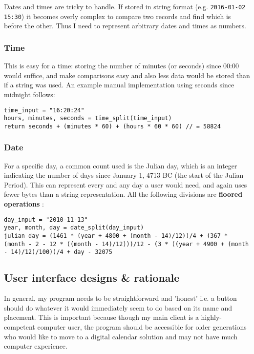 Dates and times are tricky to handle. If stored in string format (e.g.
\texttt{2016-01-02 15:30}) it becomes overly complex to compare two records and
find which is before the other. Thus I need to represent arbitrary dates and
times as numbers.


\subsubsection{Time}

This is easy for a time: storing the number of minutes (or seconds) since 00:00
would suffice, and make comparisons easy and also less data would be stored than
if a string was used. An example manual implementation using seconds
since midnight follows:

\begin{verbatim}
time_input = "16:20:24"
hours, minutes, seconds = time_split(time_input)
return seconds + (minutes * 60) + (hours * 60 * 60) // = 58824
\end{verbatim}


\subsubsection{Date}

For a specific day, a common count used is the Julian day, which is an integer
indicating the number of days since January 1, 4713 BC (the start of the Julian
Period). This can represent every and any day a user would need, and again uses
fewer bytes than a string representation. All the following divisions are
\textbf{floored operations} \cite{wiki-julian}:

\begin{verbatim}
day_input = "2010-11-13"
year, month, day = date_split(day_input)
julian_day = (1461 * (year + 4800 + (month - 14)/12))/4 + (367 * (month - 2 - 12 * ((month - 14)/12)))/12 - (3 * ((year + 4900 + (month - 14)/12)/100))/4 + day - 32075
\end{verbatim}


\subsection{User interface designs \& rationale}

In general, my program needs to be straightforward and 'honest' i.e. a button
should do whatever it would immediately seem to do based on its name and
placement. This is important because though my main client is a highly-competent
computer user, the program should be accessible for older generations who would
like to move to a digital calendar solution and may not have much computer
experience.

